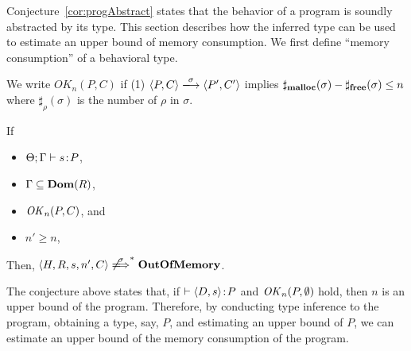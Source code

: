 Conjecture~\ref{cor:progAbstract} states that the behavior of a program
is soundly abstracted by its type.  This section describes how the
inferred type can be used to estimate an upper bound of memory
consumption.  We first define ``memory consumption'' of a behavioral
type.

\begin{myDef}
\label{df:okn} We write \(OK_n(P, C)\) if (1) \(\langle P, C \rangle
\xlongrightarrow{\sigma} \langle P', C'\rangle \) implies
\(\sharp_{\mathbf{malloc}}(\sigma) - \sharp_{\mathbf{free}}(\sigma) \le n\) where
$\sharp_\rho(\sigma)$ is the number of $\rho$ in $\sigma$.
\end{myDef}

\begin{conjecture}
\label{lem:immediateSafety}
If
 \begin{itemize}
  \item $\Theta;\Gamma \vdash s \!:\! P$,
  \item $\Gamma \subseteq \mathbf{Dom}(R)$,
  \item $\mathit{OK}_n(P,C)$, and
  \item $n' \ge n$,
 \end{itemize}
 Then, \(\langle H, R, s, n', C \rangle \not\xLongrightarrow{\sigma}^* \OVERFLOW \).
\end{conjecture}

The conjecture above states that, if $\vdash \langle D, s \rangle \!:\!
P$ and $\mathit{OK}_n(P,\emptyset)$ hold, then $n$ is an upper bound of the
program.  Therefore, by conducting type inference to the program,
obtaining a type, say, $P$, and estimating an upper bound of $P$, we can
estimate an upper bound of the memory consumption of the program.








